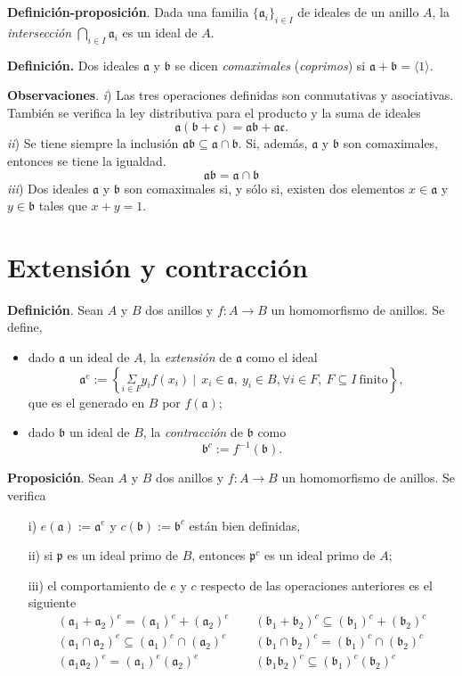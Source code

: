 \documentclass[a4paper,12pt]{article}
\newcommand{\p}{\mathfrak{p}}
\newcommand{\af}{\mathfrak{a}}
\newcommand{\bfr}{\mathfrak{b}}
\newcommand{\cf}{\mathfrak{c}}
\begin{document}
\textbf{Definición-proposición}. Dada una familia $\{\af_i\}_{i\in I}$ de ideales de un anillo $A$, la \textit{intersección} $\bigcap_{i\in I}\af_i$ es un ideal de $A$.

\textbf{Definición.} Dos ideales $\af$ y $\bfr$ se dicen \textit{comaximales} (\textit{coprimos}) si $\af+\bfr=\langle 1\rangle$.

\textbf{Observaciones}. \textit{i}) Las tres operaciones definidas son conmutativas y asociativas. También se verifica la ley distributiva para el producto y la suma de ideales$$\af(\bfr+\cf)=\af\bfr+\af\cf.$$
\textit{ii}) Se tiene siempre la inclusión $\af\bfr\subseteq\af\cap\bfr$. Si, además, $\af$ y $\bfr$ son comaximales, entonces se tiene la igualdad.$$\af\bfr=\af\cap\bfr$$
\textit{iii}) Dos ideales $\af$ y $\bfr$ son comaximales si, y sólo si, existen dos elementos $x\in\af$ y $y\in\bfr$ tales que $x+y=1$.

\section{Extensión y contracción}
\textbf{Definición}. Sean $A$ y $B$ dos anillos y $f:A\longrightarrow B$ un homomorfismo de anillos. Se define,
\begin{itemize}
    \item dado $\af$ un ideal de $A$, la \textit{extensión} de $\af$ como el ideal$$\af^e:=\left\{\underset{i\in F}{\Sigma} y_if(x_i)\ |\ \ x_i\in\af,\ y_i\in B, \forall i\in F,\ F\subseteq I\ \text{finito}\right\},$$que es el generado en $B$ por $f(\af)$;
    \item dado $\bfr$ un ideal de $B$, la \textit{contracción} de $\bfr$ como$$\bfr^c:=f^{-1}(\bfr).$$
\end{itemize}

\textbf{Proposición}. Sean $A$ y $B$ dos anillos y $f:A\longrightarrow B$ un homomorfismo de anillos. Se verifica
\begin{itemize}
    \item[i)] $e(\af):=\af^e$ y $c(\bfr):=\bfr^c$ están bien definidas,
    \item[ii)] si $\p$ es un ideal primo de $B$, entonces $\p^c$ es un ideal primo de $A$;
    \item[iii)]el comportamiento de $e$ y $c$ respecto de las operaciones anteriores es el siguiente\begin{align*}
        (\af_1+\af_2)^e=(\af_1)^e+(\af_2)^e\hspace{15pt}& (\bfr_1+\bfr_2)^c\subseteq(\bfr_1)^c+(\bfr_2)^c\\
        (\af_1\cap\af_2)^e\subseteq(\af_1)^e\cap(\af_2)^e\hspace{15pt}&(\bfr_1\cap\bfr_2)^c=(\bfr_1)^c\cap(\bfr_2)^c\\
        (\af_1\af_2)^e=(\af_1)^e(\af_2)^e\hspace{15pt}& (\bfr_1\bfr_2)^c\subseteq(\bfr_1)^c(\bfr_2)^c
    \end{align*}
\end{itemize}
\end{document}
